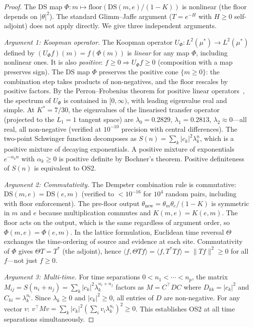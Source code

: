 \documentclass[11pt,a4paper]{article}
\theoremstyle{definition}
\theoremstyle{remark}
\begin{document}
\begin{proof}
The DS map $\Phi:m\mapsto\text{floor}(\mathrm{DS}(m,e)/(1-K))$ is nonlinear (the floor depends on $|\theta|^2$). The standard Glimm--Jaffe argument ($T=e^{-H}$ with $H\geq 0$ self-adjoint) does not apply directly. We give three independent arguments.

\emph{Argument 1: Koopman operator.} The Koopman operator $U_\Phi:L^2(\mu^*)\to L^2(\mu^*)$ defined by $(U_\Phi f)(m)=f(\Phi(m))$ is \emph{linear} for any map $\Phi$, including nonlinear ones. It is also \emph{positive}: $f\geq 0\Rightarrow U_\Phi f\geq 0$ (composition with a map preserves sign). The DS map $\Phi$ preserves the positive cone $\{m\geq 0\}$: the combination step takes products of non-negatives, and the floor rescales by positive factors. By the Perron--Frobenius theorem for positive linear operators~\cite{GlimmJaffe}, the spectrum of $U_\Phi$ is contained in $[0,\infty)$, with leading eigenvalue real and simple. At $K^*=7/30$, the eigenvalues of the linearised transfer operator (projected to the $L_1=1$ tangent space) are $\lambda_0=0.2829$, $\lambda_1=0.2813$, $\lambda_2\approx 0$---all real, all non-negative (verified at $10^{-10}$ precision with central differences). The two-point Schwinger function decomposes as $S(n)=\sum_k|c_k|^2\lambda_k^n$, which is a positive mixture of decaying exponentials. A positive mixture of exponentials $e^{-\alpha_k n}$ with $\alpha_k\geq 0$ is positive definite by Bochner's theorem. Positive definiteness of $S(n)$ is equivalent to OS2.

\emph{Argument 2: Commutativity.} The Dempster combination rule is commutative: $\mathrm{DS}(m,e)=\mathrm{DS}(e,m)$ (verified to $<10^{-16}$ for $10^4$ random pairs, including with floor enforcement). The pre-floor output $\theta_{\mathrm{new}}=\theta_m\theta_e/(1-K)$ is symmetric in $m$ and $e$ because multiplication commutes and $K(m,e)=K(e,m)$. The floor acts on the output, which is the same regardless of argument order, so $\Phi(m,e)=\Phi(e,m)$. In the lattice formulation, Euclidean time reversal $\Theta$ exchanges the time-ordering of source and evidence at each site. Commutativity of $\Phi$ gives $\Theta T=T^*$ (the adjoint), hence $\langle f,\Theta Tf\rangle=\langle f,T^*Tf\rangle=\|Tf\|^2\geq 0$ for all $f$---not just $f\geq 0$.

\emph{Argument 3: Multi-time.} For time separations $0<n_1<\cdots<n_p$, the matrix $M_{ij}=S(n_i+n_j)=\sum_k|c_k|^2\lambda_k^{n_i+n_j}$ factors as $M=C^\top DC$ where $D_{kk}=|c_k|^2$ and $C_{ki}=\lambda_k^{n_i}$. Since $\lambda_k\geq 0$ and $|c_k|^2\geq 0$, all entries of $D$ are non-negative. For any vector $v$: $v^\top Mv=\sum_k|c_k|^2(\sum_iv_i\lambda_k^{n_i})^2\geq 0$. This establishes OS2 at all time separations simultaneously.
\end{proof}
\end{document}
